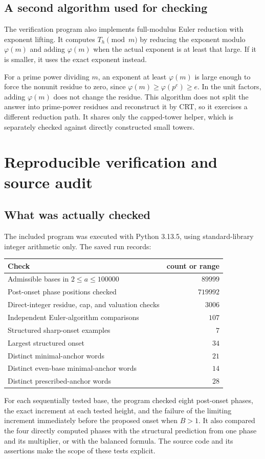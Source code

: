 \documentclass[11pt,letterpaper]{article}
\numberwithin{equation}{section}
\theoremstyle{definition}
\begin{document}
\subsection{A second algorithm used for checking}
The verification program also implements full-modulus Euler reduction with
exponent lifting. It computes $T_h\pmod m$ by reducing the exponent modulo
$\varphi(m)$ and adding $\varphi(m)$ when the actual exponent is at least that
large. If it is smaller, it uses the exact exponent instead.

For a prime power dividing $m$, an exponent at least $\varphi(m)$ is large
enough to force the nonunit residue to zero, since
$\varphi(m)\geq\varphi(p^e)\geq e$. In the unit factors, adding
$\varphi(m)$ does not change the residue. This algorithm does not split the
answer into prime-power residues and reconstruct it by CRT, so it exercises
a different reduction path. It shares only the capped-tower helper, which is
separately checked against directly constructed small towers.

\section{Reproducible verification and source audit}\label{sec:audit}

\subsection{What was actually checked}
The included program was executed with Python 3.13.5, using standard-library
integer arithmetic only. The saved run records:
\begin{center}
\begin{tabular}{lr}
\toprule
Check & count or range\\
\midrule
Admissible bases in $2\leq a\leq100000$ & $89999$\\
Post-onset phase positions checked & $719992$\\
Direct-integer residue, cap, and valuation checks & $3006$\\
Independent Euler-algorithm comparisons & $107$\\
Structured sharp-onset examples & $7$\\
Largest structured onset & $34$\\
Distinct minimal-anchor words & $21$\\
Distinct even-base minimal-anchor words & $14$\\
Distinct prescribed-anchor words & $28$\\
\bottomrule
\end{tabular}
\end{center}
For each sequentially tested base, the program checked eight post-onset
phases, the exact increment at each tested height, and the failure of the
limiting increment immediately before the proposed onset when $B>1$.
It also compared the four directly computed phases with the structural
prediction from one phase and its multiplier, or with the balanced formula.
The source code and its assertions make the scope of these tests explicit.
\end{document}
